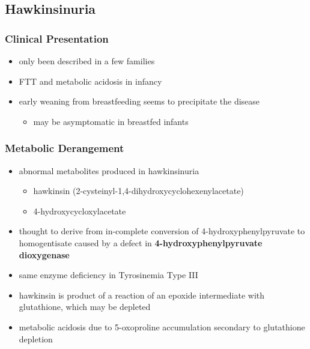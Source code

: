 \documentclass[12pt]{scrartcl}
\begin{document}
\subsection{Hawkinsinuria}
\label{sec:orgc4bc93b}
\subsubsection{Clinical Presentation}
\label{sec:orgb5a3b16}
\begin{itemize}
\item only been described in a few families
\item FTT and metabolic acidosis in infancy
\item early weaning from breastfeeding seems to precipitate the disease
\begin{itemize}
\item may be asymptomatic in breastfed infants
\end{itemize}
\end{itemize}

\subsubsection{Metabolic Derangement}
\label{sec:org59f22db}
\begin{itemize}
\item abnormal metabolites produced in hawkinsinuria
\begin{itemize}
\item hawkinsin (2-cysteinyl-1,4-dihydroxycyclohexenylacetate)
\item 4-hydroxycycloxylacetate
\end{itemize}
\item thought to derive from in-complete conversion of
4-hydroxyphenylpyruvate to homogentisate caused by a defect in
\textbf{4-hydroxyphenylpyruvate dioxygenase}
\end{itemize}


\begin{itemize}
\item same enzyme deficiency in Tyrosinemia Type III
\item hawkinsin is product of a reaction of an epoxide intermediate with
glutathione, which may be depleted
\item metabolic acidosis due to 5-oxoproline accumulation secondary to
glutathione depletion
\end{itemize}
\end{document}
